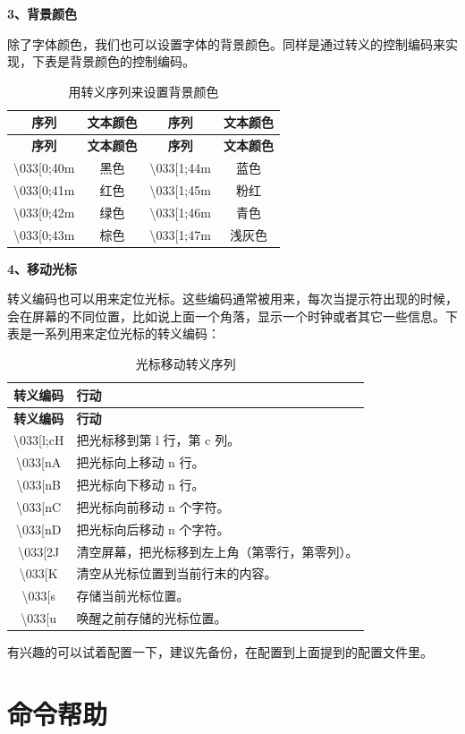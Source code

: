 \documentclass[doctor,openright,twoside]{sjtuthesis}
\theoremstyle{plain}
\theoremstyle{definition}
\theoremstyle{remark}
\theoremstyle{ocrenumbox}
\theoremstyle{plain}
\begin{document}
\textbf{3、背景颜色}

除了字体颜色，我们也可以设置字体的背景颜色。同样是通过转义的控制编码来实现，下表是背景颜色的控制编码。

\begin{longtable}[]{@{}cccc@{}}
\caption{用转义序列来设置背景颜色}\tabularnewline
\toprule
\textbf{序列} & \textbf{文本颜色} & \textbf{序列} &
\textbf{文本颜色}\tabularnewline
\midrule
\endfirsthead
\toprule
\textbf{序列} & \textbf{文本颜色} & \textbf{序列} &
\textbf{文本颜色}\tabularnewline
\midrule
\endhead
\textbackslash{}033{[}0;40m & 黑色 & \textbackslash{}033{[}1;44m &
蓝色\tabularnewline
\textbackslash{}033{[}0;41m & 红色 & \textbackslash{}033{[}1;45m &
粉红\tabularnewline
\textbackslash{}033{[}0;42m & 绿色 & \textbackslash{}033{[}1;46m &
青色\tabularnewline
\textbackslash{}033{[}0;43m & 棕色 & \textbackslash{}033{[}1;47m &
浅灰色\tabularnewline
\bottomrule
\end{longtable}

\textbf{4、移动光标}

转义编码也可以用来定位光标。这些编码通常被用来，每次当提示符出现的时候，会在屏幕的不同位置，比如说上面一个角落，显示一个时钟或者其它一些信息。下表是一系列用来定位光标的转义编码：

\begin{longtable}[]{@{}cl@{}}
\caption{光标移动转义序列}\tabularnewline
\toprule
\textbf{转义编码} & \textbf{行动}\tabularnewline
\midrule
\endfirsthead
\toprule
\textbf{转义编码} & \textbf{行动}\tabularnewline
\midrule
\endhead
\textbackslash{}033{[}l;cH & 把光标移到第 l 行，第 c 列。\tabularnewline
\textbackslash{}033{[}nA & 把光标向上移动 n 行。\tabularnewline
\textbackslash{}033{[}nB & 把光标向下移动 n 行。\tabularnewline
\textbackslash{}033{[}nC & 把光标向前移动 n 个字符。\tabularnewline
\textbackslash{}033{[}nD & 把光标向后移动 n 个字符。\tabularnewline
\textbackslash{}033{[}2J &
清空屏幕，把光标移到左上角（第零行，第零列）。\tabularnewline
\textbackslash{}033{[}K &
清空从光标位置到当前行末的内容。\tabularnewline
\textbackslash{}033{[}s & 存储当前光标位置。\tabularnewline
\textbackslash{}033{[}u & 唤醒之前存储的光标位置。\tabularnewline
\bottomrule
\end{longtable}

有兴趣的可以试着配置一下，建议先备份，在配置到上面提到的配置文件里。

\section{命令帮助}
\end{document}
